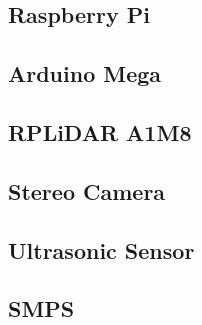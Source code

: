 \subsection{Raspberry Pi}
\subsection{Arduino Mega}
\subsection{RPLiDAR A1M8}
\subsection{Stereo Camera}
\subsection{Ultrasonic Sensor}
\subsection{SMPS}






